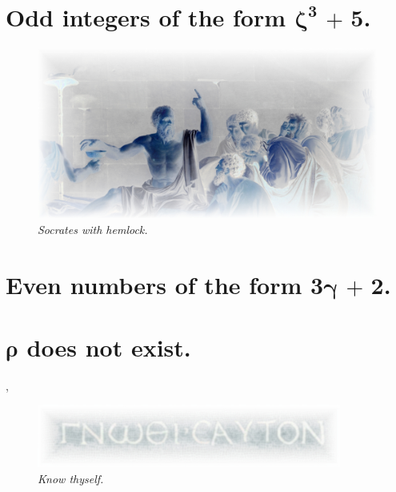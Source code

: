 \documentclass[preview]{standalone}
\begin{document}
\section{Odd integers of the form $\bm{\zeta ^3 \textbf{ + } 5}$.}

\begin{figure}[h!]
    \centering
    \includegraphics[width=13.25cm]{../resources/jpg/1.6.introduction.to.proofs/socrates.jpg}
    \caption*{\emph{Socrates with hemlock.}}
\end{figure}


\section{Even numbers of the form $\bm{3 \gamma \textbf{ + } 2}$.}

\pagebreak


\section{$\bm{\rho}$ does not exist.}

\sep
\begin{figure}[h!]
    \centering
    \includegraphics[width=10cm]{../resources/jpg/1.6.introduction.to.proofs/know_thyself.jpg}
    \caption*{\emph{Know thyself.}}
\end{figure} 
\pagebreak
\thispagestyle{empty}
\end{document}
